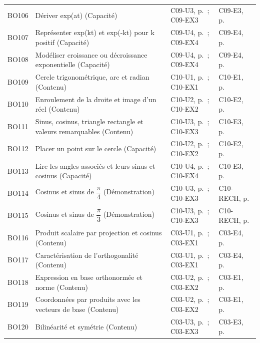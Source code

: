\begin{longtable}{p{.1\linewidth}p{.43\linewidth}p{.19\linewidth}p{.16\linewidth}}
BO106 & Dériver exp(at) (Capacité) & C09-U3, p.\,\pageref{C09-U3} ; C09-EX3 & C09-E3, p.\,\pageref{C09-E3} \\
BO107 & Représenter exp(kt) et exp(-kt) pour k positif (Capacité) & C09-U4, p.\,\pageref{C09-U4} ; C09-EX4 & C09-E4, p.\,\pageref{C09-E4} \\
BO108 & Modéliser croissance ou décroissance exponentielle (Capacité) & C09-U4, p.\,\pageref{C09-U4} ; C09-EX4 & C09-E4, p.\,\pageref{C09-E4} \\
BO109 & Cercle trigonométrique, arc et radian (Contenu) & C10-U1, p.\,\pageref{C10-U1} ; C10-EX1 & C10-E1, p.\,\pageref{C10-E1} \\
BO110 & Enroulement de la droite et image d’un réel (Contenu) & C10-U2, p.\,\pageref{C10-U2} ; C10-EX2 & C10-E2, p.\,\pageref{C10-E2} \\
BO111 & Sinus, cosinus, triangle rectangle et valeurs remarquables (Contenu) & C10-U3, p.\,\pageref{C10-U3} ; C10-EX3 & C10-E3, p.\,\pageref{C10-E3} \\
BO112 & Placer un point sur le cercle (Capacité) & C10-U2, p.\,\pageref{C10-U2} ; C10-EX2 & C10-E2, p.\,\pageref{C10-E2} \\
BO113 & Lire les angles associés et leurs sinus et cosinus (Capacité) & C10-U4, p.\,\pageref{C10-U4} ; C10-EX4 & C10-E3, p.\,\pageref{C10-E3} \\
BO114 & Cosinus et sinus de $\dfrac{\pi}{4}$ (Démonstration) & C10-U3, p.\,\pageref{C10-U3} ; C10-EX3 & C10-RECH, p.\,\pageref{C10-RECH} \\
BO115 & Cosinus et sinus de $\dfrac{\pi}{3}$ (Démonstration) & C10-U3, p.\,\pageref{C10-U3} ; C10-EX3 & C10-RECH, p.\,\pageref{C10-RECH} \\
BO116 & Produit scalaire par projection et cosinus (Contenu) & C03-U1, p.\,\pageref{C03-U1} ; C03-EX1 & C03-E4, p.\,\pageref{C03-E4} \\
BO117 & Caractérisation de l’orthogonalité (Contenu) & C03-U1, p.\,\pageref{C03-U1} ; C03-EX1 & C03-E4, p.\,\pageref{C03-E4} \\
BO118 & Expression en base orthonormée et norme (Contenu) & C03-U2, p.\,\pageref{C03-U2} ; C03-EX2 & C03-E1, p.\,\pageref{C03-E1} \\
BO119 & Coordonnées par produits avec les vecteurs de base (Contenu) & C03-U2, p.\,\pageref{C03-U2} ; C03-EX2 & C03-E1, p.\,\pageref{C03-E1} \\
BO120 & Bilinéarité et symétrie (Contenu) & C03-U3, p.\,\pageref{C03-U3} ; C03-EX3 & C03-E3, p.\,\pageref{C03-E3} \\

\end{longtable}
